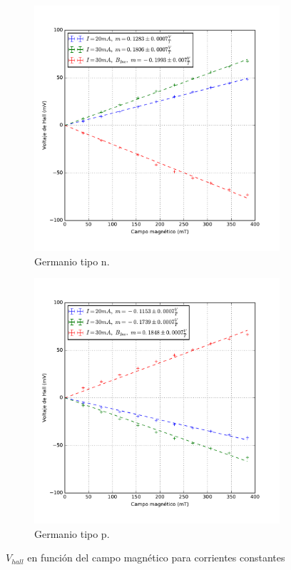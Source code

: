 \documentclass[twocolumn,showkeys,preprintnumbers,amsmath,amssymb]{revtex4}
\begin{document}
		\begin{widetext}
			
			\begin{figure}[H]
				\centering
				\begin{subfigure}[b]{0.45\textwidth}
					\includegraphics[width=\textwidth]{IConst-NGe.pdf}
					\caption{Germanio tipo n.}
					\label{fig:IConst-NGe}
				\end{subfigure}
				\begin{subfigure}[b]{0.45\textwidth}
					\includegraphics[width=\textwidth]{IConst-PGe.pdf}
					\caption{Germanio tipo p.}
					\label{fig:IConst-PGe}
				\end{subfigure}
				\caption{$V_{hall}$ en función del campo magnético para corrientes constantes}
				\label{fig:IConst}
			\end{figure}
			

\end{widetext}
\end{document}
